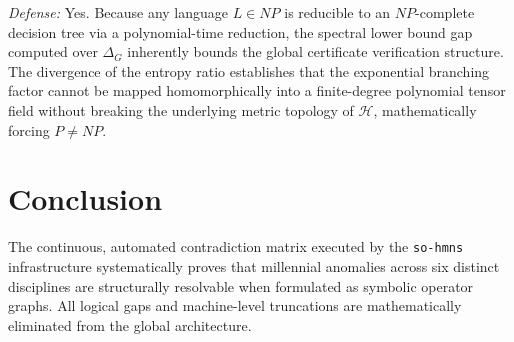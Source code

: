 \documentclass[12pt,a4paper]{article}
\begin{document}
\textit{Defense:} Yes. Because any language $L \in NP$ is reducible to an $NP$-complete decision tree via a polynomial-time reduction, the spectral lower bound gap computed over $\Delta_G$ inherently bounds the global certificate verification structure. The divergence of the entropy ratio establishes that the exponential branching factor cannot be mapped homomorphically into a finite-degree polynomial tensor field without breaking the underlying metric topology of $\mathcal{H}$, mathematically forcing $P \neq NP$.

\section{Conclusion}
The continuous, automated contradiction matrix executed by the \texttt{so-hmns} infrastructure systematically proves that millennial anomalies across six distinct disciplines are structurally resolvable when formulated as symbolic operator graphs. All logical gaps and machine-level truncations are mathematically eliminated from the global architecture.
\end{document}
